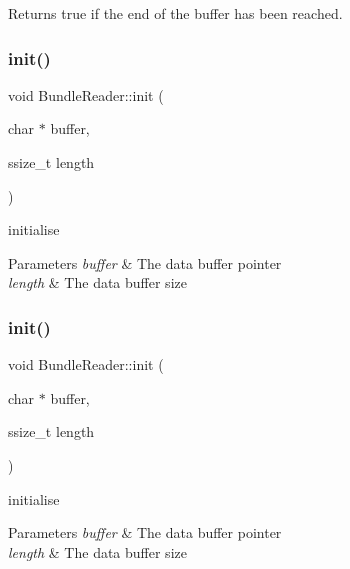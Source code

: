 Returns true if the end of the buffer has been reached. \mbox{\label{classBundleReader_a1f8504dc88fa7abf9e4017430a0e8dd8}} 
\subsubsection{\texorpdfstring{init()}{init()}\hspace{0.1cm}{\footnotesize\ttfamily [1/2]}}
{\footnotesize\ttfamily void Bundle\+Reader\+::init (\begin{DoxyParamCaption}\item[{char $\ast$}]{buffer,  }\item[{ssize\+\_\+t}]{length }\end{DoxyParamCaption})}

initialise 
\begin{DoxyParams}{Parameters}
{\em buffer} & The data buffer pointer \\
\hline
{\em length} & The data buffer size \\
\hline
\end{DoxyParams}
\mbox{\label{classBundleReader_a1f8504dc88fa7abf9e4017430a0e8dd8}} 
\subsubsection{\texorpdfstring{init()}{init()}\hspace{0.1cm}{\footnotesize\ttfamily [2/2]}}
{\footnotesize\ttfamily void Bundle\+Reader\+::init (\begin{DoxyParamCaption}\item[{char $\ast$}]{buffer,  }\item[{ssize\+\_\+t}]{length }\end{DoxyParamCaption})}

initialise 
\begin{DoxyParams}{Parameters}
{\em buffer} & The data buffer pointer \\
\hline
{\em length} & The data buffer size \\
\hline
\end{DoxyParams}
\mbox{\label{classBundleReader_a943403eea21a70e9dea729f1371a1195}} 
